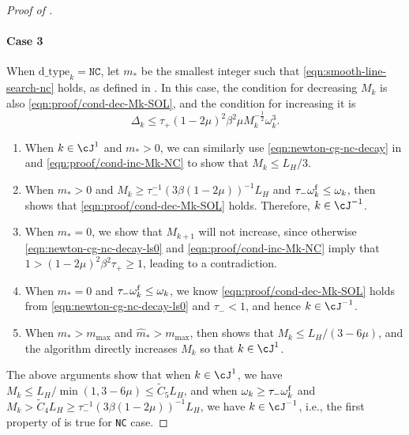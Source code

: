 \begin{proof}[Proof of ]
    \paragraph{Case 3}
     When $\text{d\_type}_k = \texttt{NC}$, let $m_*$ be the smallest integer such that \eqref{eqn:smooth-line-search-nc} holds, as defined in .
     In this case, the condition for decreasing $M_k$ is also \eqref{eqn:proof/cond-dec-Mk-SOL}, and the condition for increasing it is 
    \begin{equation}
        \label{eqn:proof/cond-inc-Mk-NC}
        \Delta_k \leq \tau_+ (1 - 2\mu)^2 \beta^2 \mu M_k^{-\frac{1}{2}} \omega_k^3.
    \end{equation}
     \begin{enumerate}
        \item When $k \in \cJ^1$ and $m_* > 0$, we can similarly use  \eqref{eqn:newton-cg-nc-decay} in  and \eqref{eqn:proof/cond-inc-Mk-NC} to show that $M_k \leq L_H / 3$. 
        \item When $m_* > 0$ and  $M_k \geq \tau_-^{-1} (3\beta(1-2\mu))^{-1} L_H$ and $\tau_-\omega_k^{\mathrm{f}}  \leq\omega_k$, then  shows that \eqref{eqn:proof/cond-dec-Mk-SOL} holds. Therefore,  $k \in \cJ^{-1}$.
        \item When $m_* = 0$, we show that $M_{k+1}$ will not increase, since otherwise \eqref{eqn:newton-cg-nc-decay-ls0} and \eqref{eqn:proof/cond-inc-Mk-NC} imply that $1 > (1 - 2\mu)^2\beta^2 \tau_+ \geq 1$, leading to a contradiction.
        \item When $m_* = 0$ and $\tau_-\omega_k^{\mathrm{f}} \leq \omega_k$, we know \eqref{eqn:proof/cond-dec-Mk-SOL} holds from \eqref{eqn:newton-cg-nc-decay-ls0} and $\tau_- < 1$, and hence $k \in \cJ^{-1}$.
        \item When $m_* > m_{\mathrm{max}}$ and $\hat m_* > m_{\mathrm{max}}$, then  shows that $M_k \leq L_H / (3 - 6\mu)$,
        and the algorithm directly increases $M_k$ so that $k \in \cJ^1$.
     \end{enumerate}
    The above arguments show that when $k \in \cJ^1$, we have $M_k \leq L_H / \min(1, 3 - 6\mu) \leq \tilde C_5 L_H$,
    and when $\omega_k \geq \tau_- \omega_k^{\mathrm{f}}$ and $M_k > \tilde C_4 L_H \geq \tau_-^{-1} (3\beta(1 - 2\mu))^{-1} L_H$, we have $k \in \cJ^{-1}$, i.e., the first property of  is true for \texttt{NC} case.


\end{proof}
